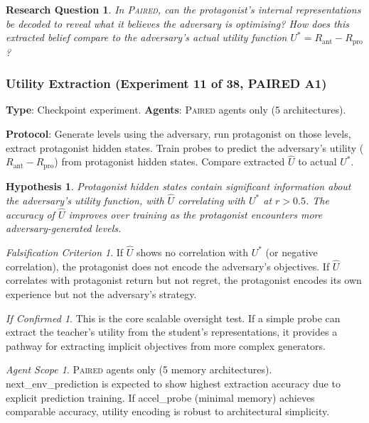 \documentclass[11pt,a4paper]{article}
\newtheorem{hypothesis}{Hypothesis}[subsection]
\newtheorem{researchq}{Research Question}[subsection]
\theoremstyle{remark}
\newtheorem*{falsification}{Falsification Criterion}
\newtheorem*{implication}{If Confirmed}
\newtheorem*{agentscope}{Agent Scope}
\newcommand{\paired}{\textsc{Paired}}
\newcommand{\Uhat}{\hat{U}}
\newcommand{\Ustar}{U^*}
\newcommand{\Rpro}{R_{\text{pro}}}
\newcommand{\Rant}{R_{\text{ant}}}
\begin{document}
\begin{researchq}
In \paired{}, can the protagonist's internal representations be decoded to reveal what it believes the adversary is optimising? How does this extracted belief compare to the adversary's actual utility function $\Ustar = \Rant - \Rpro$?
\end{researchq}

\subsubsection{Utility Extraction (Experiment 11 of 38, PAIRED A1)}
\label{exp:utility_extraction}

\textbf{Type}: Checkpoint experiment. \textbf{Agents}: \paired{} agents only (5 architectures).

\textbf{Protocol}: Generate levels using the adversary, run protagonist on those levels, extract protagonist hidden states. Train probes to predict the adversary's utility ($\Rant - \Rpro$) from protagonist hidden states. Compare extracted $\Uhat$ to actual $\Ustar$.

\begin{hypothesis}
Protagonist hidden states contain significant information about the adversary's utility function, with $\Uhat$ correlating with $\Ustar$ at $r > 0.5$. The accuracy of $\Uhat$ improves over training as the protagonist encounters more adversary-generated levels.
\end{hypothesis}

\begin{falsification}
If $\Uhat$ shows no correlation with $\Ustar$ (or negative correlation), the protagonist does not encode the adversary's objectives. If $\Uhat$ correlates with protagonist return but not regret, the protagonist encodes its own experience but not the adversary's strategy.
\end{falsification}

\begin{implication}
This is the core scalable oversight test. If a simple probe can extract the teacher's utility from the student's representations, it provides a pathway for extracting implicit objectives from more complex generators.
\end{implication}

\begin{agentscope}
\paired{} agents only (5 memory architectures). next\_env\_prediction is expected to show highest extraction accuracy due to explicit prediction training. If accel\_probe (minimal memory) achieves comparable accuracy, utility encoding is robust to architectural simplicity.
\end{agentscope}
\end{document}
